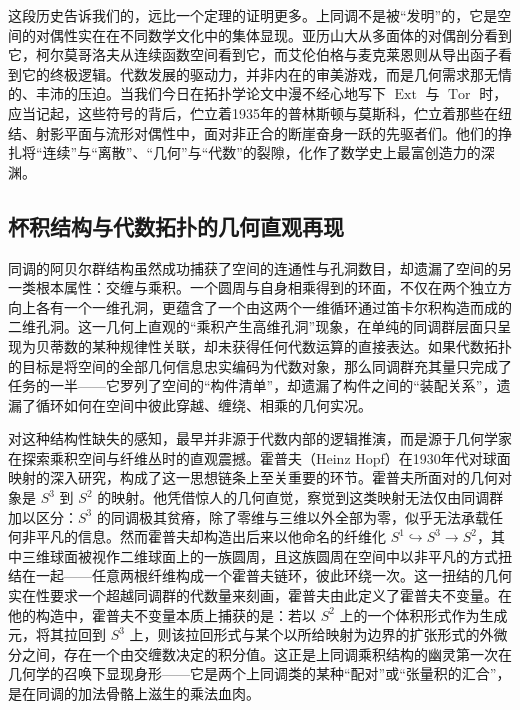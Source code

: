 \documentclass[12pt,a4paper]{article}
\begin{document}
这段历史告诉我们的，远比一个定理的证明更多。上同调不是被“发明”的，它是空间的对偶性实在在不同数学文化中的集体显现。亚历山大从多面体的对偶剖分看到它，柯尔莫哥洛夫从连续函数空间看到它，而艾伦伯格与麦克莱恩则从导出函子看到它的终极逻辑。代数发展的驱动力，并非内在的审美游戏，而是几何需求那无情的、丰沛的压迫。当我们今日在拓扑学论文中漫不经心地写下 $\operatorname{Ext}$ 与 $\operatorname{Tor}$ 时，应当记起，这些符号的背后，伫立着1935年的普林斯顿与莫斯科，伫立着那些在纽结、射影平面与流形对偶性中，面对非正合的断崖奋身一跃的先驱者们。他们的挣扎将“连续”与“离散”、“几何”与“代数”的裂隙，化作了数学史上最富创造力的深渊。

\subsection{杯积结构与代数拓扑的几何直观再现}

同调的阿贝尔群结构虽然成功捕获了空间的连通性与孔洞数目，却遗漏了空间的另一类根本属性：交缠与乘积。一个圆周与自身相乘得到的环面，不仅在两个独立方向上各有一个一维孔洞，更蕴含了一个由这两个一维循环通过笛卡尔积构造而成的二维孔洞。这一几何上直观的“乘积产生高维孔洞”现象，在单纯的同调群层面只呈现为贝蒂数的某种规律性关联，却未获得任何代数运算的直接表达。如果代数拓扑的目标是将空间的全部几何信息忠实编码为代数对象，那么同调群充其量只完成了任务的一半——它罗列了空间的“构件清单”，却遗漏了构件之间的“装配关系”，遗漏了循环如何在空间中彼此穿越、缠绕、相乘的几何实况。

对这种结构性缺失的感知，最早并非源于代数内部的逻辑推演，而是源于几何学家在探索乘积空间与纤维丛时的直观震撼。霍普夫（Heinz Hopf）在1930年代对球面映射的深入研究，构成了这一思想链条上至关重要的环节。霍普夫所面对的几何对象是 $S^3$ 到 $S^2$ 的映射。他凭借惊人的几何直觉，察觉到这类映射无法仅由同调群加以区分：$S^3$ 的同调极其贫瘠，除了零维与三维以外全部为零，似乎无法承载任何非平凡的信息。然而霍普夫却构造出后来以他命名的纤维化 $S^1 \hookrightarrow S^3 \to S^2$，其中三维球面被视作二维球面上的一族圆周，且这族圆周在空间中以非平凡的方式扭结在一起——任意两根纤维构成一个霍普夫链环，彼此环绕一次。这一扭结的几何实在性要求一个超越同调群的代数量来刻画，霍普夫由此定义了霍普夫不变量。在他的构造中，霍普夫不变量本质上捕获的是：若以 $S^2$ 上的一个体积形式作为生成元，将其拉回到 $S^3$ 上，则该拉回形式与某个以所给映射为边界的扩张形式的外微分之间，存在一个由交缠数决定的积分值。这正是上同调乘积结构的幽灵第一次在几何学的召唤下显现身形——它是两个上同调类的某种“配对”或“张量积的汇合”，是在同调的加法骨骼上滋生的乘法血肉。
\end{document}
